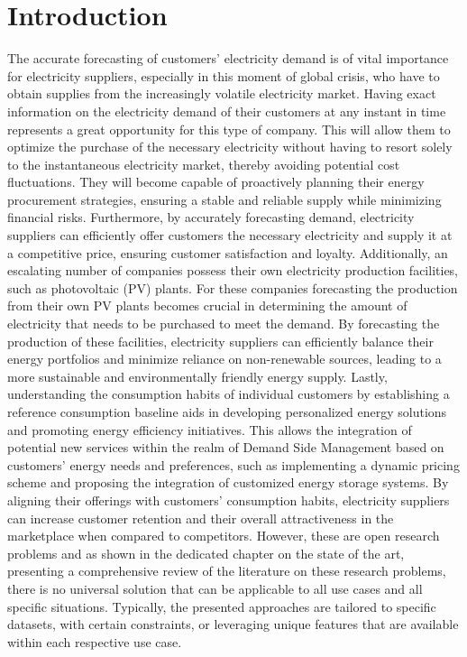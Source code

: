 \chapter{Introduction}
\label{cha:introduction}
\vspace{0.4 cm}

The accurate forecasting of customers' electricity demand is of vital importance for electricity suppliers, especially in this moment of global crisis, who have to obtain supplies from the increasingly volatile electricity market.
Having exact information on the electricity demand of their customers at any instant in time represents a great opportunity for this type of company.
This will allow them to optimize the purchase of the necessary electricity without having to resort solely to the instantaneous electricity market, thereby avoiding potential cost fluctuations.
They will become capable of proactively planning their energy procurement strategies, ensuring a stable and reliable supply while minimizing financial risks.
Furthermore, by accurately forecasting demand, electricity suppliers can efficiently offer customers the necessary electricity and supply it at a competitive price, ensuring customer satisfaction and loyalty.
Additionally, an escalating number of companies possess their own electricity production facilities, such as photovoltaic (PV) plants.
For these companies forecasting the production from their own PV plants becomes crucial in determining the amount of electricity that needs to be purchased to meet the demand.
By forecasting the production of these facilities, electricity suppliers can efficiently balance their energy portfolios and minimize reliance on non-renewable sources, leading to a more sustainable and environmentally friendly energy supply.
Lastly, understanding the consumption habits of individual customers by establishing a reference consumption baseline aids in developing personalized energy solutions and promoting energy efficiency initiatives.
This allows the integration of potential new services within the realm of Demand Side Management based on customers' energy needs and preferences, such as implementing a dynamic pricing scheme and proposing the integration of customized energy storage systems.
By aligning their offerings with customers' consumption habits, electricity suppliers can increase customer retention and their overall attractiveness in the marketplace when compared to competitors.
However, these are open research problems and as shown in the dedicated chapter on the state of the art, presenting a comprehensive review of the literature on these research problems, there is no universal solution that can be applicable to all use cases and all specific situations.
Typically, the presented approaches are tailored to specific datasets, with certain constraints, or leveraging unique features that are available within each respective use case.

